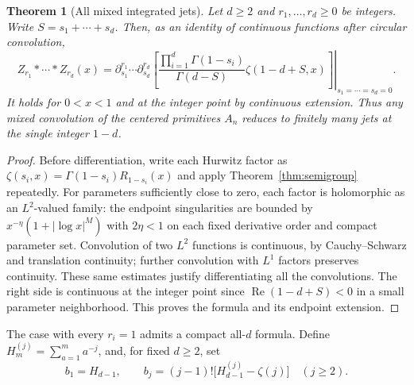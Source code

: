 \documentclass[11pt]{article}
\numberwithin{equation}{section}
\newtheorem{theorem}{Theorem}[section]
\theoremstyle{definition}
\theoremstyle{remark}
\DeclareMathOperator{\Rea}{Re}
\begin{document}
\begin{theorem}[All mixed integrated jets]\label{thm:integrated}
Let $d\ge2$ and $r_1,\ldots,r_d\ge0$ be integers. Write
$S=s_1+\cdots+s_d$. Then, as an identity of continuous functions after
circular convolution,
\begin{equation}\label{eq:mixedintegrated}
 Z_{r_1}*\cdots*Z_{r_d}(x)
 =\left.
 \partial_{s_1}^{r_1}\cdots\partial_{s_d}^{r_d}
 \left[\frac{\prod_{i=1}^d\Gamma(1-s_i)}{\Gamma(d-S)}
              \zeta(1-d+S,x)\right]\right|_{s_1=\cdots=s_d=0}.
\end{equation}
It holds for $0<x<1$ and at the integer point by continuous extension.
Thus any mixed convolution of the centered primitives $A_n$ reduces to
finitely many jets at the single integer $1-d$.
\end{theorem}
\begin{proof}
Before differentiation, write each Hurwitz factor as
$\zeta(s_i,x)=\Gamma(1-s_i)R_{1-s_i}(x)$ and apply
Theorem~\ref{thm:semigroup} repeatedly. For parameters sufficiently close
to zero, each factor is holomorphic as an $L^2$-valued family: the
endpoint singularities are bounded by
$x^{-\eta}(1+|\log x|^M)$ with $2\eta<1$ on each fixed derivative
order and compact parameter set. Convolution of two $L^2$ functions is
continuous, by Cauchy--Schwarz and translation continuity; further
convolution with $L^1$ factors preserves continuity. These same estimates
justify differentiating all the convolutions. The right side is
continuous at the integer point since $\Rea(1-d+S)<0$ in a small
parameter neighborhood. This proves the formula and its endpoint
extension.
\end{proof}

The case with every $r_i=1$ admits a compact all-$d$ formula. Define
$H_m^{(j)}=\sum_{a=1}^ma^{-j}$, and, for fixed $d\ge2$, set
\begin{equation}\label{eq:bd}
 b_1=H_{d-1},\qquad
 b_j=(j-1)!\big[H_{d-1}^{(j)}-\zeta(j)\big]\quad(j\ge2).
\end{equation}
\end{document}

